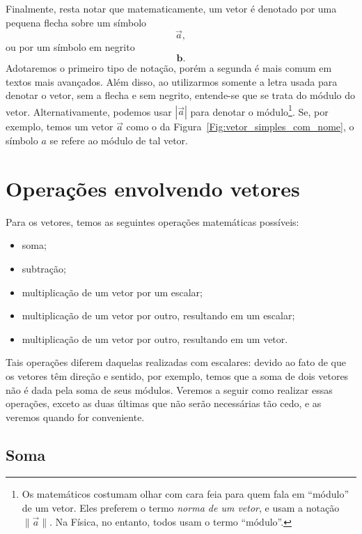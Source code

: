 Finalmente, resta notar que matematicamente, um vetor é denotado por uma pequena flecha sobre um símbolo
\begin{equation*}
    \vec{a},
\end{equation*}
%
ou por um símbolo em negrito
\begin{equation*}
    \bm{b}.
\end{equation*}
%
Adotaremos o primeiro tipo de notação, porém a segunda é mais comum em textos mais avançados. Além disso, ao utilizarmos somente a letra usada para denotar o vetor, sem a flecha e sem negrito, entende-se que se trata do módulo do vetor. Alternativamente, podemos usar $|\vec{a}|$ para denotar o módulo\footnote{Os matemáticos costumam olhar com cara feia para quem fala em ``módulo'' de um vetor. Eles preferem o termo \emph{norma de um vetor}, e usam a notação $\lVert\vec{a}\rVert$. Na Física, no entanto, todos usam o termo ``módulo''.}. Se, por exemplo, temos um vetor $\vec{a}$ como o da Figura~\ref{Fig:vetor_simples_com_nome}, o símbolo $a$ se refere ao módulo de tal vetor.

\section{Operações envolvendo vetores}

Para os vetores, temos as seguintes operações matemáticas possíveis:
\begin{itemize}
    \item soma;
    \item subtração;
    \item multiplicação de um vetor por um escalar;
    \item multiplicação de um vetor por outro, resultando em um escalar;
    \item multiplicação de um vetor por outro, resultando em um vetor.
\end{itemize}

Tais operações diferem daquelas realizadas com escalares: devido ao fato de que os vetores têm direção e sentido, por exemplo, temos que a soma de dois vetores não é dada pela soma de seus módulos. Veremos a seguir como realizar essas operações, exceto as duas últimas que não serão necessárias tão cedo, e as veremos quando for conveniente.

\subsection{Soma}

